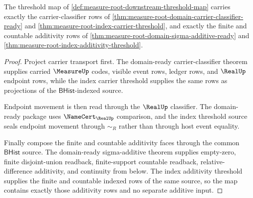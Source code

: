 \begin{theorem}
\label{thm:measure-root-threshold-map-carrier-additivity}
The threshold map of
\autoref{def:measure-root-downstream-threshold-map} carries exactly the
carrier-classifier rows of
\autoref{thm:measure-root-domain-carrier-classifier-ready} and
\autoref{thm:measure-root-index-carrier-threshold}, and exactly the finite
and countable additivity rows of
\autoref{thm:measure-root-domain-sigma-additive-ready} and
\autoref{thm:measure-root-index-additivity-threshold}.
\end{theorem}
\begin{proof}
Project carrier transport first. The domain-ready carrier-classifier theorem
supplies carried $\MeasureUp$ codes, visible event rows, ledger rows, and
$\RealUp$ endpoint rows, while the index carrier threshold supplies the same
rows as projections of the $\mathsf{BHist}$-indexed source.

Endpoint movement is then read through the $\RealUp$ classifier. The
domain-ready package uses $\NameCert_{\RealUp}$ comparison, and the index
threshold source seals endpoint movement through $\sim_R$ rather than through
host event equality.

Finally compose the finite and countable additivity faces through the common
$\mathsf{BHist}$ source. The domain-ready sigma-additive theorem supplies
empty-zero, finite disjoint-union readback, finite-support countable readback,
relative-difference additivity, and continuity from below. The index
additivity threshold supplies the finite and countable indexed rows of the
same source, so the map contains exactly those additivity rows and no
separate additive input.
\end{proof}

